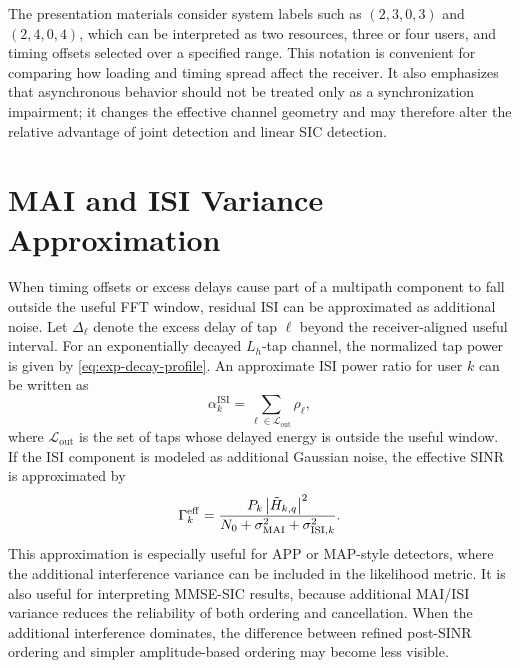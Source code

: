 The presentation materials consider system labels such as $(2,3,0,3)$ and $(2,4,0,4)$, which can be interpreted as two resources, three or four users, and timing offsets selected over a specified range. This notation is convenient for comparing how loading and timing spread affect the receiver. It also emphasizes that asynchronous behavior should not be treated only as a synchronization impairment; it changes the effective channel geometry and may therefore alter the relative advantage of joint detection and linear SIC detection.

\section{MAI and ISI Variance Approximation}

When timing offsets or excess delays cause part of a multipath component to fall outside the useful FFT window, residual ISI can be approximated as additional noise. Let $\Delta_\ell$ denote the excess delay of tap $\ell$ beyond the receiver-aligned useful interval. For an exponentially decayed $L_h$-tap channel, the normalized tap power is given by \eqref{eq:exp-decay-profile}. An approximate ISI power ratio for user $k$ can be written as
\begin{equation}
    \alpha^{\mathrm{ISI}}_k
    =
    \sum_{\ell\in\mathcal{L}_{\mathrm{out}}}
    \rho_\ell,
    \label{eq:isi-ratio}
\end{equation}
where $\mathcal{L}_{\mathrm{out}}$ is the set of taps whose delayed energy is outside the useful window. If the ISI component is modeled as additional Gaussian noise, the effective SINR is approximated by
\begin{equation}
    \Gamma^{\mathrm{eff}}_k
    =
    \frac{P_k\left\lvert \tilde{H}_{k,q} \right\rvert^2}
    {N_0+\sigma^2_{\mathrm{MAI}}+\sigma^2_{\mathrm{ISI},k}}.
    \label{eq:async-effective-sinr}
\end{equation}
This approximation is especially useful for APP or MAP-style detectors, where the additional interference variance can be included in the likelihood metric. It is also useful for interpreting MMSE-SIC results, because additional MAI/ISI variance reduces the reliability of both ordering and cancellation. When the additional interference dominates, the difference between refined post-SINR ordering and simpler amplitude-based ordering may become less visible.


